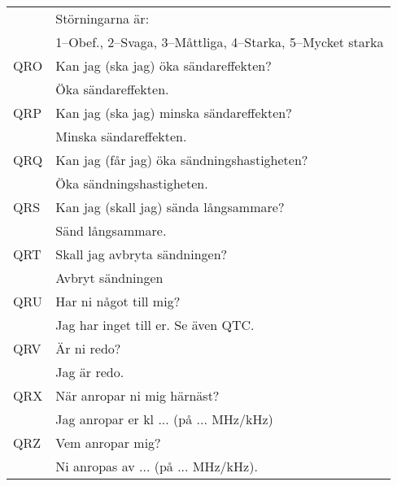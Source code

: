 \documentclass[10pt,swedish,a4paper]{article}
\begin{document}
\begin{longtable}{ll}
	             & Störningarna är:                                                      \\
	             & 1--Obef., 2--Svaga, 3--Måttliga, 4--Starka, 5--Mycket starka          \\ \hline
	QRO          & Kan jag (ska jag) öka sändareffekten?                                 \\
	             & Öka sändareffekten.                                                   \\ \hline
	QRP          & Kan jag (ska jag) minska sändareffekten?                              \\
	             & Minska sändareffekten.                                                \\ \hline
	QRQ          & Kan jag (får jag) öka sändningshastigheten?                           \\
	             & Öka sändningshastigheten.                                             \\ \hline
	QRS          & Kan jag (skall jag) sända långsammare?                                \\
	             & Sänd långsammare.                                                     \\ \hline
	QRT          & Skall jag avbryta sändningen?                                         \\
	             & Avbryt sändningen                                                     \\ \hline
	QRU          & Har ni något till mig?                                                \\
	             & Jag har inget till er. Se även QTC.                                   \\ \hline
	QRV          & Är ni redo?                                                           \\
	             & Jag är redo.                                                          \\ \hline
	QRX          & När anropar ni mig härnäst?                                           \\
	             & Jag anropar er kl ... (på ... MHz/kHz)                                \\ \hline
	QRZ          & Vem anropar mig?                                                      \\
	             & Ni anropas av ... (på ... MHz/kHz).                                   \\ \hline

\end{longtable}
\end{document}
